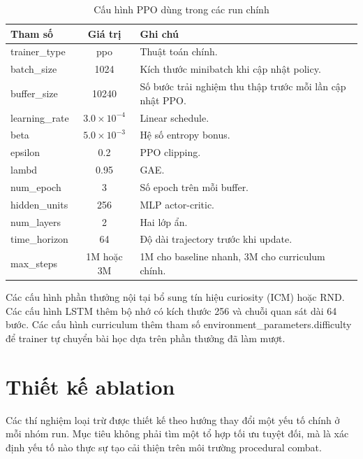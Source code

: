\begin{table}[H]
    \centering
    \small
    \caption{Cấu hình PPO dùng trong các run chính}
    \label{tab:ppo_baseline_config}
    \begin{tabular}{|p{4cm}|c|p{7cm}|}
        \hline
        \textbf{Tham số} & \textbf{Giá trị} & \textbf{Ghi chú} \\
        \hline
        trainer\_type & ppo & Thuật toán chính. \\
        \hline
        batch\_size & 1024 & Kích thước minibatch khi cập nhật policy. \\
        \hline
        buffer\_size & 10240 & Số bước trải nghiệm thu thập trước mỗi lần cập nhật PPO. \\
        \hline
        learning\_rate & $3.0 \times 10^{-4}$ & Linear schedule. \\
        \hline
        beta & $5.0 \times 10^{-3}$ & Hệ số entropy bonus. \\
        \hline
        epsilon & 0.2 & PPO clipping. \\
        \hline
        lambd & 0.95 & GAE. \\
        \hline
        num\_epoch & 3 & Số epoch trên mỗi buffer. \\
        \hline
        hidden\_units & 256 & MLP actor-critic. \\
        \hline
        num\_layers & 2 & Hai lớp ẩn. \\
        \hline
        time\_horizon & 64 & Độ dài trajectory trước khi update. \\
        \hline
        max\_steps & 1M hoặc 3M & 1M cho baseline nhanh, 3M cho curriculum chính. \\
        \hline
    \end{tabular}
\end{table}

Các cấu hình phần thưởng nội tại bổ sung tín hiệu curiosity (ICM) hoặc RND. Các cấu hình LSTM thêm bộ nhớ có kích thước 256 và chuỗi quan sát dài 64 bước. Các cấu hình curriculum thêm tham số environment\_parameters.difficulty để trainer tự chuyển bài học dựa trên phần thưởng đã làm mượt.

\section{Thiết kế ablation}

Các thí nghiệm loại trừ được thiết kế theo hướng thay đổi một yếu tố chính ở mỗi nhóm run. Mục tiêu không phải tìm một tổ hợp tối ưu tuyệt đối, mà là xác định yếu tố nào thực sự tạo cải thiện trên môi trường procedural combat.

